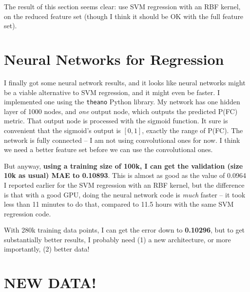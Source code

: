 \documentclass[a4paper, 11pt]{article}
\begin{document}
The result of this section seems clear: use SVM regression with an RBF kernel, on the reduced
feature set (though I think it should be OK with the full feature set).




\section{Neural Networks for Regression}

I finally got some neural network results, and it looks like neural networks might be a viable
alternative to SVM regression, and it might even be faster. I implemented one using the
\texttt{theano} Python library. My network has one hidden layer of 1000 nodes, and \emph{one} output
node, which outputs the predicted P(FC) metric. That output node is processed with the sigmoid
function. It sure is convenient that the sigmoid's output is $[0,1]$, exactly the range of P(FC).
The network is fully connected -- I am not using convolutional ones for now. I think we need a
better feature set before we can use the convolutional ones.

But anyway, \textbf{using a training size of 100k, I can get the validation (size 10k as usual) MAE
to 0.10893}. This is almost as good as the value of 0.0964 I reported earlier for the SVM regression
with an RBF kernel, but the difference is that with a good GPU, doing the neural network code is
\emph{much} faster -- it took less than 11 minutes to do that, compared to 11.5 hours with the same
SVM regression code.

With 280k training data points, I can get the error down to \textbf{0.10296}, but to get
substantially better results, I probably need (1) a new architecture, or more importantly, (2)
better data!





\section{NEW DATA!}
\end{document}
